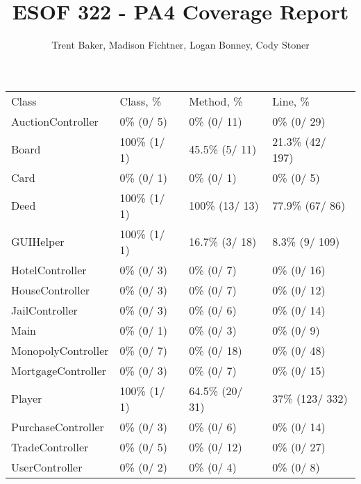 \documentclass[10pt,letterpaper]{article}
\author{Trent Baker, Madison Fichtner, Logan Bonney, Cody Stoner}
\title{ESOF 322 - PA4 Coverage Report}
\begin{document}
\maketitle
\begin{tabularx}{\linewidth}{X X X X}
	Class & Class, \% & Method, \% & Line, \% \\
	AuctionController & 0\% (0/ 5) & 0\% (0/ 11) & 0\% (0/ 29) \\
	Board & 100\% (1/ 1) & 45.5\% (5/ 11) & 21.3\% (42/ 197) \\
	Card & 0\% (0/ 1) & 0\% (0/ 1) & 0\% (0/ 5) \\
	Deed & 100\% (1/ 1) & 100\% (13/ 13) & 77.9\% (67/ 86) \\
	GUIHelper & 100\% (1/ 1) & 16.7\% (3/ 18) & 8.3\% (9/ 109) \\
	HotelController & 0\% (0/ 3) & 0\% (0/ 7) & 0\% (0/ 16) \\
	HouseController & 0\% (0/ 3) & 0\% (0/ 7) & 0\% (0/ 12) \\
	JailController & 0\% (0/ 3) & 0\% (0/ 6) & 0\% (0/ 14) \\
	Main & 0\% (0/ 1) & 0\% (0/ 3) & 0\% (0/ 9) \\
	MonopolyController & 0\% (0/ 7) & 0\% (0/ 18) & 0\% (0/ 48) \\
	MortgageController & 0\% (0/ 3) & 0\% (0/ 7) & 0\% (0/ 15) \\
	Player & 100\% (1/ 1) & 64.5\% (20/ 31) & 37\% (123/ 332) \\
	PurchaseController & 0\% (0/ 3) & 0\% (0/ 6) & 0\% (0/ 14) \\
	TradeController & 0\% (0/ 5) & 0\% (0/ 12) & 0\% (0/ 27) \\
	UserController & 0\% (0/ 2) & 0\% (0/ 4) & 0\% (0/ 8) \\
\end{tabularx}
\end{document}

